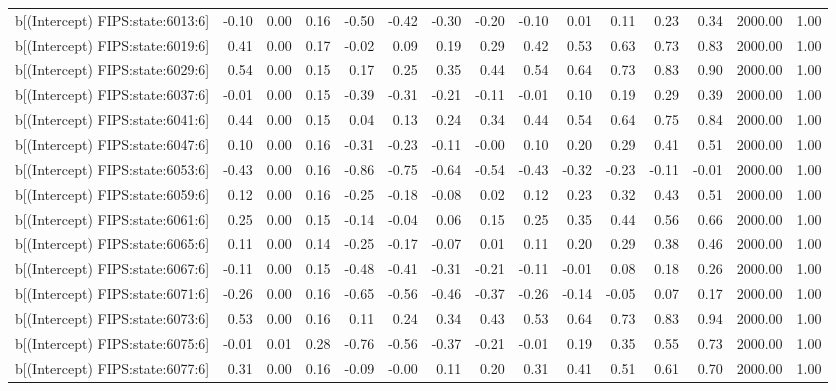 \begin{table}[ht]
\begin{tabular}{rrrrrrrrrrrrrrr}
  b[(Intercept) FIPS:state:6013:6] & -0.10 & 0.00 & 0.16 & -0.50 & -0.42 & -0.30 & -0.20 & -0.10 & 0.01 & 0.11 & 0.23 & 0.34 & 2000.00 & 1.00 \\ 
  b[(Intercept) FIPS:state:6019:6] & 0.41 & 0.00 & 0.17 & -0.02 & 0.09 & 0.19 & 0.29 & 0.42 & 0.53 & 0.63 & 0.73 & 0.83 & 2000.00 & 1.00 \\ 
  b[(Intercept) FIPS:state:6029:6] & 0.54 & 0.00 & 0.15 & 0.17 & 0.25 & 0.35 & 0.44 & 0.54 & 0.64 & 0.73 & 0.83 & 0.90 & 2000.00 & 1.00 \\ 
  b[(Intercept) FIPS:state:6037:6] & -0.01 & 0.00 & 0.15 & -0.39 & -0.31 & -0.21 & -0.11 & -0.01 & 0.10 & 0.19 & 0.29 & 0.39 & 2000.00 & 1.00 \\ 
  b[(Intercept) FIPS:state:6041:6] & 0.44 & 0.00 & 0.15 & 0.04 & 0.13 & 0.24 & 0.34 & 0.44 & 0.54 & 0.64 & 0.75 & 0.84 & 2000.00 & 1.00 \\ 
  b[(Intercept) FIPS:state:6047:6] & 0.10 & 0.00 & 0.16 & -0.31 & -0.23 & -0.11 & -0.00 & 0.10 & 0.20 & 0.29 & 0.41 & 0.51 & 2000.00 & 1.00 \\ 
  b[(Intercept) FIPS:state:6053:6] & -0.43 & 0.00 & 0.16 & -0.86 & -0.75 & -0.64 & -0.54 & -0.43 & -0.32 & -0.23 & -0.11 & -0.01 & 2000.00 & 1.00 \\ 
  b[(Intercept) FIPS:state:6059:6] & 0.12 & 0.00 & 0.16 & -0.25 & -0.18 & -0.08 & 0.02 & 0.12 & 0.23 & 0.32 & 0.43 & 0.51 & 2000.00 & 1.00 \\ 
  b[(Intercept) FIPS:state:6061:6] & 0.25 & 0.00 & 0.15 & -0.14 & -0.04 & 0.06 & 0.15 & 0.25 & 0.35 & 0.44 & 0.56 & 0.66 & 2000.00 & 1.00 \\ 
  b[(Intercept) FIPS:state:6065:6] & 0.11 & 0.00 & 0.14 & -0.25 & -0.17 & -0.07 & 0.01 & 0.11 & 0.20 & 0.29 & 0.38 & 0.46 & 2000.00 & 1.00 \\ 
  b[(Intercept) FIPS:state:6067:6] & -0.11 & 0.00 & 0.15 & -0.48 & -0.41 & -0.31 & -0.21 & -0.11 & -0.01 & 0.08 & 0.18 & 0.26 & 2000.00 & 1.00 \\ 
  b[(Intercept) FIPS:state:6071:6] & -0.26 & 0.00 & 0.16 & -0.65 & -0.56 & -0.46 & -0.37 & -0.26 & -0.14 & -0.05 & 0.07 & 0.17 & 2000.00 & 1.00 \\ 
  b[(Intercept) FIPS:state:6073:6] & 0.53 & 0.00 & 0.16 & 0.11 & 0.24 & 0.34 & 0.43 & 0.53 & 0.64 & 0.73 & 0.83 & 0.94 & 2000.00 & 1.00 \\ 
  b[(Intercept) FIPS:state:6075:6] & -0.01 & 0.01 & 0.28 & -0.76 & -0.56 & -0.37 & -0.21 & -0.01 & 0.19 & 0.35 & 0.55 & 0.73 & 2000.00 & 1.00 \\ 
  b[(Intercept) FIPS:state:6077:6] & 0.31 & 0.00 & 0.16 & -0.09 & -0.00 & 0.11 & 0.20 & 0.31 & 0.41 & 0.51 & 0.61 & 0.70 & 2000.00 & 1.00 \\ 

\end{tabular}
\end{table}
